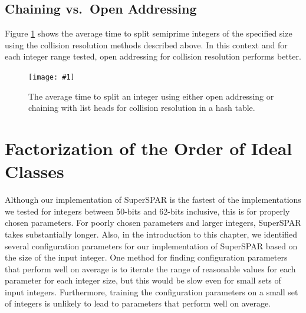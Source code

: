 \documentclass{ucalgthes1}
\theoremstyle{definition}
\newcommand{\set}{\mathcal}
\newcommand{\mygraphX}[4]{
	\begin{figure}[htb]
	\centering
	\texttt{[image: \#1]}
	\caption[#4]{#3}
	\label{#2}
	\end{figure}
}
\begin{document}
\subsection{Chaining vs.\ Open Addressing}

Figure \ref{fig:ssparHashing} shows the average time to split semiprime integers of the specified size using the collision resolution methods described above.  In this context and for each integer range tested, open addressing for collision resolution performs better.

\mygraphX{hashing-open-vs-chained}{fig:ssparHashing}{The average time to split an integer using either open addressing or chaining with list heads for collision resolution in a hash table.}{Open addressing vs Chaining.}

\section{Factorization of the Order of Ideal Classes}
\label{sec:ssparFactorizationOfTheOrder}

\newcommand{\idealDataSet}{\set D}

Although our implementation of SuperSPAR is the fastest of the implementations we tested for integers between 50-bits and 62-bits inclusive, this is for properly chosen parameters.  For poorly chosen parameters and larger integers, SuperSPAR takes substantially longer.  Also, in the introduction to this chapter, we identified several configuration parameters for our implementation of SuperSPAR based on the size of the input integer.  One method for finding configuration parameters that perform well on average is to iterate the range of reasonable values for each parameter for each integer size, but this would be slow even for small sets of input integers.  Furthermore, training the configuration parameters on a small set of integers is unlikely to lead to parameters that perform well on average.  
\end{document}
